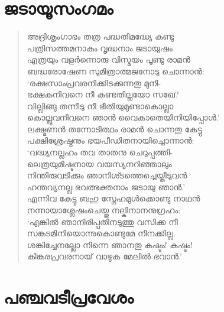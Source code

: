 \section{ജടായൂസംഗമം}

\begin{verse}
അദ്രിശൃംഗാഭം തത്ര പദ്ധതിമദ്ധ്യേ കണ്ടു\\
പത്രിസത്തമനാകും വൃദ്ധനാം ജടായുഷം\\
എത്രയും വളര്‍ന്നൊരു വിസ്മയം പൂണ്ടു രാമന്‍\\
ബദ്ധരോഷേണ സുമിത്രാത്മജനോടു ചൊന്നാന്‍:\\
‘രക്ഷസാംപ്രവരനിക്കിടക്കുന്നതു മുനി-\\
ഭക്ഷകനിവനെ നീ കണ്ടതില്ലയോ സഖേ?\\
വില്ലിങ്ങു തന്നീടു നീ ഭീതിയുമുണ്ടാകൊല്ലാ\\
കൊല്ലുവനിവനെ ഞാന്‍ \hbox{വൈകാതെയിനിയിപ്പോള്‍.’}\\
ലക്ഷ്മണന്‍ തന്നോടിത്ഥം രാമന്‍ ചൊന്നതു കേട്ടു\\
പക്ഷിശ്രേഷ്ഠനും ഭയപീഡിതനായിച്ചൊന്നാന്‍:\\
‘വദ്ധ്യനല്ലഹം തവ താതനു ചെറുപ്പത്തി-\\
ലെത്രയുമിഷ്ടനായ വയസ്യനറിഞ്ഞാലും\\
നിന്തിരുവടിക്കും ഞാനിശ്ടത്തെച്ചെയ്തീടുവന്‍\\
ഹന്തവ്യനല്ല ഭവത്ഭക്തനാം ജടായു ഞാന്‍.’\\
എന്നിവ കേട്ടു ബഹു സ്നേഹമുള്‍ക്കൊണ്ടു നാഥന്‍\\
നന്നായാശ്ലേഷംചെയ്തു നല്കിനാനനുഗ്രഹം:\\
‘എങ്കില്‍ ഞാനിരിപ്പതിനടുത്തു വസിക്ക നീ\\
സങ്കടമിനിയൊന്നുകൊണ്ടുമേ നിനക്കില്ല.\\
ശങ്കിച്ചേനല്ലോ നിന്നെ ഞാനതു കഷ്ടം! കഷ്ടം!\\
കിങ്കരപ്രവരനായ് വാഴുക മേലില്‍ ഭവാന്‍.’
\end{verse}

\section{പഞ്ചവടീപ്രവേശം}

